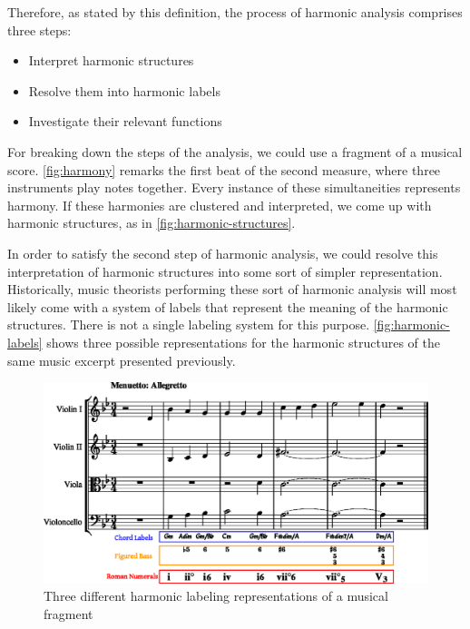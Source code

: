 Therefore, as stated by this definition, the process of harmonic analysis comprises three steps:

\begin{itemize}
  \item Interpret harmonic structures
  \item Resolve them into harmonic labels
  \item Investigate their relevant functions
\end{itemize}

For breaking down the steps of the analysis, we could use a fragment of a musical score. \autoref{fig:harmony} remarks the first beat of the second measure, where three instruments play notes together. Every instance of these simultaneities represents harmony. If these harmonies are clustered and interpreted, we come up with harmonic structures, as in  \autoref{fig:harmonic-structures}.

In order to satisfy the second step of harmonic analysis, we could resolve this interpretation of harmonic structures into some sort of simpler representation. Historically, music theorists performing these sort of harmonic analysis will most likely come with a system of labels that represent the meaning of the harmonic structures. There is not a single labeling system for this purpose. \autoref{fig:harmonic-labels} shows three possible representations for the harmonic structures of the same music excerpt presented previously.

\begin{figure}[h]
  \centering
    \includegraphics[width=1.0\textwidth]{01-introduction/figures/3}
  \caption{Three different harmonic labeling representations of a musical fragment}
  \label{fig:harmonic-labels}
\end{figure}

